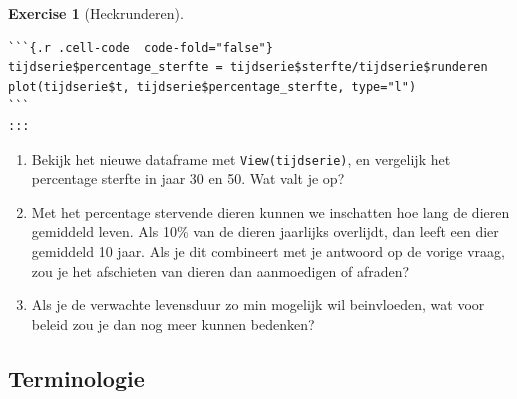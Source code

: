 \documentclass[
  letterpaper,
  DIV=11,
  numbers=noendperiod]{scrartcl}
\theoremstyle{definition}
\newtheorem{exercise}{Exercise}[section]
\theoremstyle{remark}
\begin{document}
\begin{exercise}[Heckrunderen]
\begin{verbatim}
```{.r .cell-code  code-fold="false"}
tijdserie$percentage_sterfte = tijdserie$sterfte/tijdserie$runderen
plot(tijdserie$t, tijdserie$percentage_sterfte, type="l")
```
:::
\end{verbatim}

\begin{enumerate}
\def\labelenumi{\alph{enumi}.}
\setcounter{enumi}{6}
\item
  Bekijk het nieuwe dataframe met \texttt{View(tijdserie)}, en vergelijk
  het percentage sterfte in jaar 30 en 50. Wat valt je op?
\item
  Met het percentage stervende dieren kunnen we inschatten hoe lang de
  dieren gemiddeld leven. Als 10\% van de dieren jaarlijks overlijdt,
  dan leeft een dier gemiddeld 10 jaar. Als je dit combineert met je
  antwoord op de vorige vraag, zou je het afschieten van dieren dan
  aanmoedigen of afraden?
\item
  Als je de verwachte levensduur zo min mogelijk wil beinvloeden, wat
  voor beleid zou je dan nog meer kunnen bedenken?
\end{enumerate}

\end{exercise}

\subsection{Terminologie}\label{terminologie}
\end{document}
